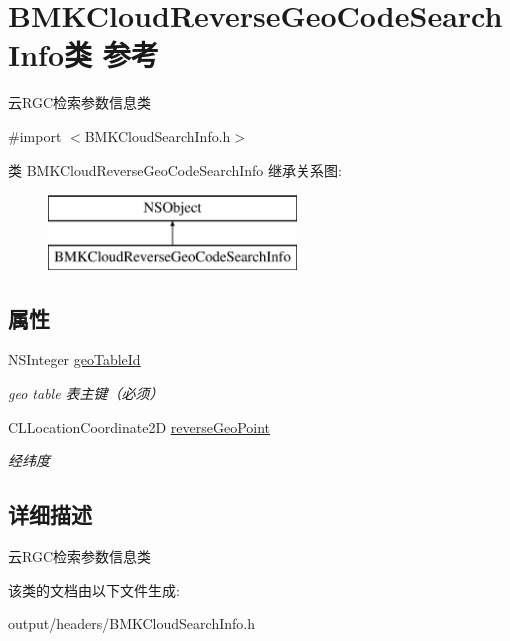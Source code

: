 \hypertarget{interface_b_m_k_cloud_reverse_geo_code_search_info}{}\section{B\+M\+K\+Cloud\+Reverse\+Geo\+Code\+Search\+Info类 参考}
\label{interface_b_m_k_cloud_reverse_geo_code_search_info}


云\+R\+G\+C检索参数信息类  




{\ttfamily \#import $<$B\+M\+K\+Cloud\+Search\+Info.\+h$>$}

类 B\+M\+K\+Cloud\+Reverse\+Geo\+Code\+Search\+Info 继承关系图\+:\begin{figure}[H]
\begin{center}
\leavevmode
\includegraphics[height=2.000000cm]{interface_b_m_k_cloud_reverse_geo_code_search_info}
\end{center}
\end{figure}
\subsection*{属性}
\begin{DoxyCompactItemize}
\item 
\hypertarget{interface_b_m_k_cloud_reverse_geo_code_search_info_a492dd1ca21b4e3da24805695227a46f5}{}N\+S\+Integer \hyperlink{interface_b_m_k_cloud_reverse_geo_code_search_info_a492dd1ca21b4e3da24805695227a46f5}{geo\+Table\+Id}\label{interface_b_m_k_cloud_reverse_geo_code_search_info_a492dd1ca21b4e3da24805695227a46f5}

\begin{DoxyCompactList}\small\item\em geo table 表主键（必须） \end{DoxyCompactList}\item 
\hypertarget{interface_b_m_k_cloud_reverse_geo_code_search_info_a4b8a6bc3c951ef15e9e66dfb060563df}{}C\+L\+Location\+Coordinate2\+D \hyperlink{interface_b_m_k_cloud_reverse_geo_code_search_info_a4b8a6bc3c951ef15e9e66dfb060563df}{reverse\+Geo\+Point}\label{interface_b_m_k_cloud_reverse_geo_code_search_info_a4b8a6bc3c951ef15e9e66dfb060563df}

\begin{DoxyCompactList}\small\item\em 经纬度 \end{DoxyCompactList}\end{DoxyCompactItemize}


\subsection{详细描述}
云\+R\+G\+C检索参数信息类 

该类的文档由以下文件生成\+:\begin{DoxyCompactItemize}
\item 
output/headers/B\+M\+K\+Cloud\+Search\+Info.\+h\end{DoxyCompactItemize}
